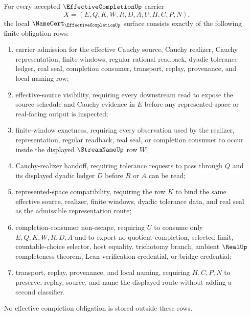 \begin{theorem}
\label{thm:effective-completion-namecert-obligations}
For every accepted $\EffectiveCompletionUp$ carrier
$$
X=(E,Q,K,W,R,D,A,U,H,C,P,N),
$$
the local $\NameCert_{\EffectiveCompletionUp}$ surface consists exactly of the following finite obligation rows:
\begin{enumerate}
\item carrier admission for the effective Cauchy source, Cauchy realizer, Cauchy representation, finite windows, regular rational readback, dyadic tolerance ledger, real seal, completion consumer, transport, replay, provenance, and local naming row;
\item effective-source visibility, requiring every downstream read to expose the source schedule and Cauchy evidence in $E$ before any represented-space or real-facing output is inspected;
\item finite-window exactness, requiring every observation used by the realizer, representation, regular readback, real seal, or completion consumer to occur inside the displayed $\StreamNameUp$ row $W$;
\item Cauchy-realizer handoff, requiring tolerance requests to pass through $Q$ and its displayed dyadic ledger $D$ before $R$ or $A$ can be read;
\item represented-space compatibility, requiring the row $K$ to bind the same effective source, realizer, finite windows, dyadic tolerance data, and real seal as the admissible representation route;
\item completion-consumer non-escape, requiring $U$ to consume only $E,Q,K,W,R,D,A$ and to export no quotient completion, selected limit, countable-choice selector, host equality, trichotomy branch, ambient $\RealUp$ completeness theorem, Lean verification credential, or bridge credential;
\item transport, replay, provenance, and local naming, requiring $H,C,P,N$ to preserve, replay, source, and name the displayed route without adding a second classifier.
\end{enumerate}
No effective completion obligation is stored outside these rows.
\end{theorem}
